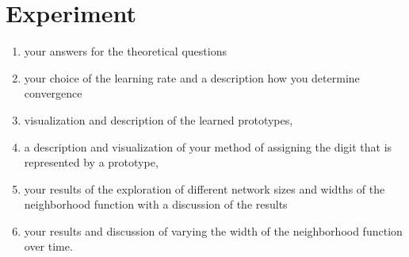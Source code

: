 \documentclass[12pt, twocolumn]{article}
\begin{document}
\section{Experiment}
\begin{enumerate}
\item your answers for the theoretical questions
\item your choice of the learning rate and a description how you determine convergence
\item visualization and description of the learned prototypes,
\item a description and visualization of your method of assigning the digit that is represented by a prototype,
\item your results of the exploration of different network sizes and widths of the neighborhood function with a discussion of the results
\item your results and discussion of varying the width of the neighborhood function over time.
\end{enumerate}
\end{document}
